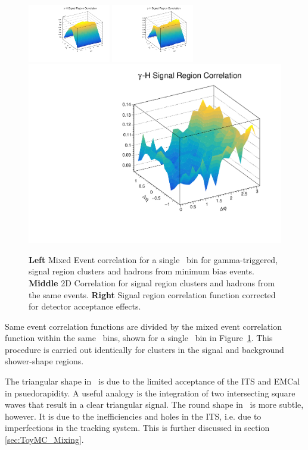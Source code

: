 \begin{figure}
\includegraphics[width=0.32\textwidth]{Data_Analysis/G-H_New/2D_SR_ME.pdf}
\includegraphics[width=0.32\textwidth]{Data_Analysis/G-H_New/2D_SR_SE.pdf}
\includegraphics[width = 0.32 \textwidth]{Data_Analysis/G-H_New/2D_SR.pdf}
\caption{\textbf{Left} Mixed Event correlation for a single \zt~bin for gamma-triggered, signal region clusters and hadrons from minimum bias events. \textbf{Middle} 2D Correlation for signal region clusters and hadrons from the same events. \textbf{Right} Signal region correlation function corrected for detector acceptance effects.}
\label{fig:SR_2D}
\end{figure}

Same event correlation functions are divided by the mixed event correlation function within the same \zt~bins, shown for a single \zt~bin in Figure~\ref{fig:SR_2D}. This procedure is carried out identically for clusters in the signal and background shower-shape regions. 

The triangular shape in \deltaeta~is due to the limited acceptance of the ITS and EMCal in psuedorapidity. A useful analogy is the integration of two intersecting square waves that result in a clear triangular signal. The round shape in \deltaphi~is more subtle, however. It is due to the inefficiencies and holes in the ITS, i.e. due to imperfections in the tracking system. This is further discussed in section \ref{sec:ToyMC_Mixing}.




